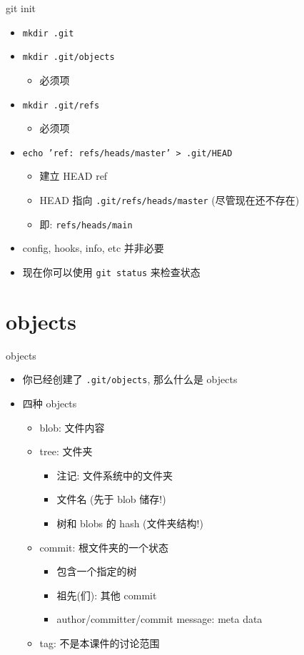 \documentclass[aspectratio=169]{beamer}
\newcommand{\T}[1]{\texttt{#1}}
\begin{document}
\begin{frame}{git init}
  \begin{itemize}
    \item \T{mkdir .git}
    \item \T{mkdir .git/objects}\begin{itemize}
      \item 必须项
    \end{itemize}
    \item \T{mkdir .git/refs}\begin{itemize}
      \item 必须项
    \end{itemize}
    \item \T{echo 'ref: refs/heads/master' > .git/HEAD}\begin{itemize}
      \item 建立 {HEAD} ref
      \item HEAD 指向 \T{.git/refs/heads/master} (尽管现在还不存在)
      \item 即: \T{refs/heads/main}
    \end{itemize}
    \item config, hooks, info, etc 并非必要
    \item 现在你可以使用 \T{git status} 来检查状态
  \end{itemize}
\end{frame}

\section{objects}
\begin{frame}{objects}
  \begin{itemize}
    \item<1-> 你已经创建了 \T{.git/objects}, 那么什么是 objects
    \item<2-> 四种 objects\begin{itemize}
      \item<3-> blob: 文件内容
      \item<4-> tree: 文件夹\begin{itemize}
        \item 注记: 文件系统中的文件夹
        \item 文件名 (先于 blob 储存!)
        \item 树和 blobs 的 hash (文件夹结构!)
      \end{itemize}
      \item<5-> commit: 根文件夹的一个状态\begin{itemize}
        \item 包含一个指定的树
        \item 祖先(们): 其他 commit 
        \item author/committer/commit message: meta data
      \end{itemize}
      \item<6-> tag: 不是本课件的讨论范围
    \end{itemize}
  \end{itemize}
\end{frame}
\end{document}
